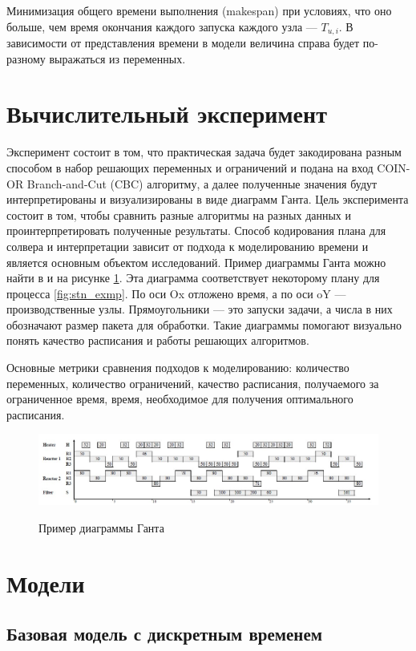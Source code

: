 \documentclass[12pt, twoside]{article}
\theoremstyle{definition}
\begin{document}
Минимизация общего времени выполнения (makespan) при условиях, что оно больше, чем время окончания каждого запуска каждого узла --- $T_{u, i}$. В зависимости от представления времени в модели величина справа будет по-разному выражаться из переменных.

\section{Вычислительный эксперимент}

Эксперимент состоит в том, что практическая задача будет закодирована разным способом в набор решающих переменных и ограничений и подана на вход COIN-OR Branch-and-Cut (CBC) алгоритму, а далее полученные значения будут интерпретированы и визуализированы в виде диаграмм Ганта. Цель эксперимента состоит в том, чтобы сравнить разные алгоритмы на разных данных и проинтерпретировать полученные результаты. Способ кодирования плана для солвера и интерпретации зависит от подхода к моделированию времени и является основным объектом исследований. Пример диаграммы Ганта можно найти в \cite{discretetime} и на рисунке \ref{fig:gannt_example}. Эта диаграмма соответствует некоторому плану для процесса \ref{fig:stn_exmp}. По оси Ox отложено время, а по оси oY --- производственные узлы. Прямоугольники --- это запуски задачи, а числа в них обозначают размер пакета для обработки. Такие диаграммы помогают визуально понять качество расписания и работы решающих алгоритмов. 

Основные метрики сравнения подходов к моделированию: количество переменных, количество ограничений, качество расписания, получаемого за ограниченное время, время, необходимое для получения оптимального расписания.

\begin{figure}[h]
\caption{Пример диаграммы Ганта}
\centering
\includegraphics[width=1.0\textwidth]{диаграмма ганта}
\label{fig:gannt_example}
\end{figure}

\section{Модели}
\subsection{Базовая модель с дискретным временем}
\label{subsection:base}
\end{document}
